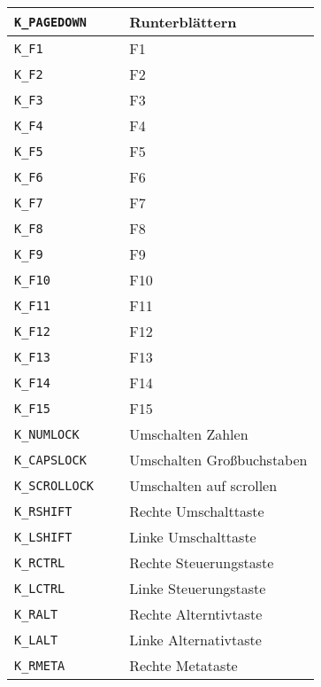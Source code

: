 \begin{longtable}{lll}
\texttt{K\_PAGEDOWN}     &  \verb+ +     &  Runterblättern\\ \hline
\texttt{K\_F1}           &  \verb+ +     &  F1\\ \hline
\texttt{K\_F2}           &  \verb+ +     &  F2\\ \hline
\texttt{K\_F3}           &  \verb+ +     &  F3\\ \hline
\texttt{K\_F4}           &  \verb+ +     &  F4\\ \hline
\texttt{K\_F5}           &  \verb+ +     &  F5\\ \hline
\texttt{K\_F6}           &  \verb+ +     &  F6\\ \hline
\texttt{K\_F7}           &  \verb+ +     &  F7\\ \hline
\texttt{K\_F8}           &  \verb+ +     &  F8\\ \hline
\texttt{K\_F9}           &  \verb+ +     &  F9\\ \hline
\texttt{K\_F10}          &  \verb+ +     &  F10\\ \hline
\texttt{K\_F11}          &  \verb+ +     &  F11\\ \hline
\texttt{K\_F12}          &  \verb+ +     &  F12\\ \hline
\texttt{K\_F13}          &  \verb+ +     &  F13\\ \hline
\texttt{K\_F14}          &  \verb+ +     &  F14\\ \hline
\texttt{K\_F15}          &  \verb+ +     &  F15\\ \hline
\texttt{K\_NUMLOCK}      &  \verb+ +     &  Umschalten Zahlen\\ \hline
\texttt{K\_CAPSLOCK}     &  \verb+ +     &  Umschalten Großbuchstaben\\ \hline
\texttt{K\_SCROLLOCK}    &  \verb+ +     &  Umschalten auf scrollen\\ \hline
\texttt{K\_RSHIFT}       &  \verb+ +     &  Rechte Umschalttaste\\ \hline
\texttt{K\_LSHIFT}       &  \verb+ +     &  Linke Umschalttaste\\ \hline
\texttt{K\_RCTRL}        &  \verb+ +     &  Rechte Steuerungstaste\\ \hline
\texttt{K\_LCTRL}        &  \verb+ +     &  Linke Steuerungstaste\\ \hline
\texttt{K\_RALT}         &  \verb+ +     &  Rechte Alterntivtaste\\ \hline
\texttt{K\_LALT}         &  \verb+ +     &  Linke Alternativtaste\\ \hline
\texttt{K\_RMETA}        &  \verb+ +     &  Rechte Metataste\\ \hline

\end{longtable}
